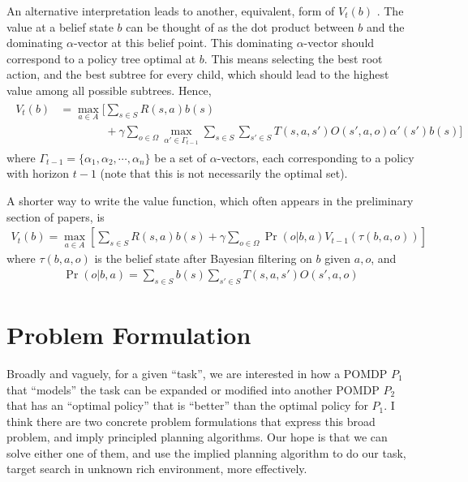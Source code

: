 \documentclass{article}
\begin{document}
An alternative interpretation leads to another, equivalent, form of $V_t(b)$ \cite{pineau2003point}. The value at a belief state $b$ can be thought of as the dot product between $b$ and the dominating $\alpha$-vector at this belief point. This dominating $\alpha$-vector should correspond to a policy tree optimal at $b$. This means selecting the best root action, and the best subtree for every child, which should lead to the highest value among all possible subtrees. Hence,
\begin{align}
\begin{split}
V_t(b) &= \max_{a\in A} \Bigg[ \sum_{s\in S} R(s,a)b(s)\\
&\qquad\qquad+ \gamma \sum_{o\in\Omega} \max_{\alpha'\in \Gamma_{t-1}} \sum_{s\in S} \sum_{s'\in S} T(s,a,s')O(s',a,o)\alpha'(s')b(s)  \Bigg]
\end{split}
\end{align}
where $\Gamma_{t-1}=\{\alpha_1,\alpha_2,\cdots,\alpha_n\}$ be a set of $\alpha$-vectors, each corresponding to a policy with horizon $t-1$ (note that this is not necessarily the optimal set).

A shorter way to write the value function, which often appears in the preliminary section of papers, is \cite{lee2007makes}
\begin{align}
V_t(b) = \max_{a\in A}\left[ \sum_{s\in S} R(s,a)b(s) + \gamma \sum_{o\in\Omega} \Pr(o | b,a) V_{t-1}(\tau(b,a,o))   \right]
\end{align}
where $\tau(b,a,o)$ is the belief state after Bayesian filtering on $b$ given $a,o$, and
\begin{align}
\Pr(o | b,a) = \sum_{s\in S}b(s)\sum_{s'\in S}T(s,a,s')O(s',a,o)
\end{align}






\section{Problem Formulation}
Broadly and vaguely, for a given ``task'', we are interested in how a POMDP $P_1$ that ``models'' the task can be expanded or modified into another POMDP $P_2$ that has an ``optimal policy'' that is ``better'' than the optimal policy for $P_1$.  I think there are two concrete problem formulations that express this broad problem, and imply principled planning algorithms. Our hope is that we can solve either one of them, and use the implied planning algorithm to do our task, target search in unknown rich environment, more effectively.
\end{document}
